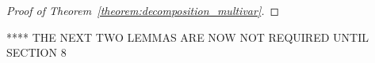\documentclass[10pt,a4paper]{paper}
\theoremstyle{definition}
\newcommand{\processes}{\mathbb{P}}
\newcommand{\wprocesses}{\processes^{\mathrm{W}}}
\newcommand{\rateset}{\mathcal{Q}}
\newcommand{\norm}[1]{\left\lVert #1 \right\rVert}
\begin{document}
\begin{proof}[Proof of Theorem~\ref{theorem:decomposition_multivar}]
\end{proof}



**** THE NEXT TWO LEMMAS ARE NOW NOT REQUIRED UNTIL SECTION 8
\end{document}
